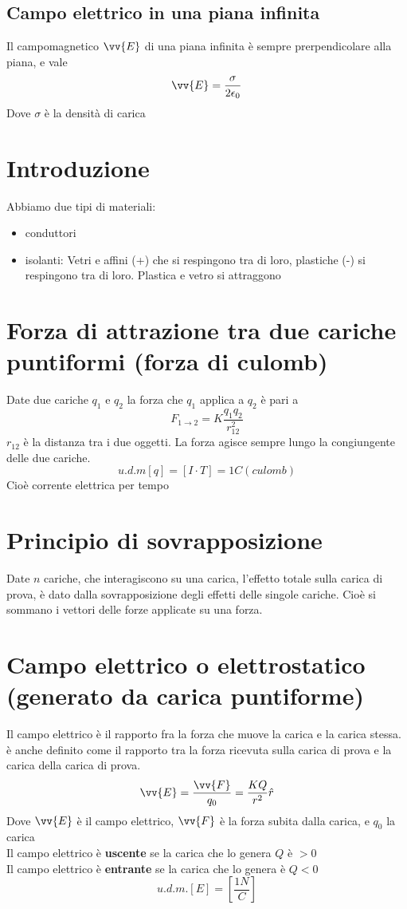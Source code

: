 \documentclass[a4paper]{report}
\begin{document}
  \subsection{Campo elettrico in una piana infinita}
  Il campomagnetico $\vv{E}$ di una piana infinita è sempre prerpendicolare alla piana, e vale
  $$ \vv{E} = \frac{\sigma}{2\epsilon_0} $$
  Dove $\sigma$ è la densità di carica

  \section{Introduzione}
  Abbiamo due tipi di materiali:
  \begin{itemize}
    \item conduttori
    \item isolanti: Vetri e affini (+) che si respingono tra di loro, plastiche (-) si respingono tra di loro. Plastica e vetro si attraggono
  \end{itemize}

  \section{Forza di attrazione tra due cariche puntiformi (forza di culomb)}
  Date due cariche $q_1$ e $q_2$ la forza che $q_1$ applica a $q_2$ è pari a
  $$ F_{1 \rightarrow 2} = K \frac{q_1 q_2}{r_{12}^2} $$
  $r_{12}$ è la distanza tra i due oggetti. La forza agisce sempre lungo la congiungente delle due cariche.
  $$u.d.m[q] = [I\cdot T] = 1C (culomb)$$
  Cioè corrente elettrica per tempo

  \section{Principio di sovrapposizione}
  Date $n$ cariche, che interagiscono su una carica, l'effetto totale sulla carica di prova, è dato dalla sovrapposizione degli effetti delle singole cariche. Cioè si sommano i vettori delle forze applicate su una forza.

  \section{Campo elettrico o elettrostatico (generato da carica puntiforme)}
  Il campo elettrico è il rapporto fra la forza che muove la carica e la carica stessa. è anche definito come il rapporto tra la forza ricevuta sulla carica di prova e la carica della carica di prova.
  $$\vv{E} = \frac{\vv{F}}{q_0} = \frac{K Q}{r^2} \hat{r}$$
  Dove $\vv{E}$ è il campo elettrico, $\vv{F}$ è la forza subita dalla carica, e $q_0$ la carica\\
  Il campo elettrico è \textbf{uscente} se la carica che lo genera $Q$ è $>0$\\
  Il campo elettrico è \textbf{entrante} se la carica che lo genera è $Q<0$
  $$ u.d.m.[E] = [\frac{1N}{C}]$$
\end{document}

